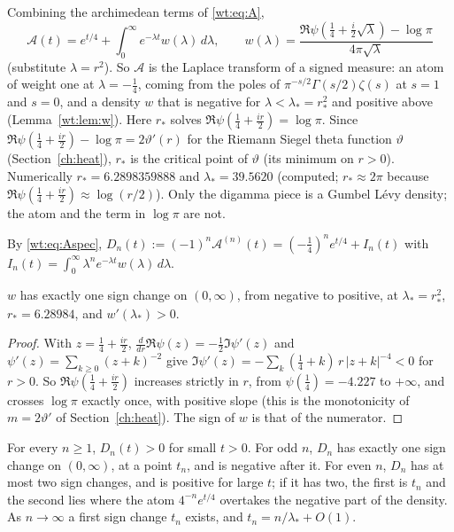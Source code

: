 Combining the archimedean terms of \eqref{wt:eq:A},
\begin{equation}\label{wt:eq:Aspec}
\mathcal A(t)=e^{t/4}+\int_0^\infty e^{-\lambda t}w(\lambda)\,d\lambda,\qquad w(\lambda)=\frac{\Re\psi(\frac14+\frac i2\sqrt\lambda)-\log\pi}{4\pi\sqrt\lambda}
\end{equation}
(substitute $\lambda=r^2$). So $\mathcal A$ is the Laplace transform of a signed measure: an atom of weight one at $\lambda=-\frac14$, coming from the poles of $\pi^{-s/2}\Gamma(s/2)\zeta(s)$ at $s=1$ and $s=0$, and a density $w$ that is negative for $\lambda<\lambda_*=r_*^2$ and positive above (Lemma~\ref{wt:lem:w}). Here $r_*$ solves $\Re\psi(\frac14+\frac{ir}2)=\log\pi$. Since $\Re\psi(\frac14+\frac{ir}2)-\log\pi=2\vartheta'(r)$ for the Riemann Siegel theta function $\vartheta$ (Section~\ref{ch:heat}), $r_*$ is the critical point of $\vartheta$ (its minimum on $r>0$). Numerically $r_*=6.2898359888$ and $\lambda_*=39.5620$ (computed; $r_*\approx2\pi$ because $\Re\psi(\frac14+\frac{ir}2)\approx\log(r/2)$). Only the digamma piece is a Gumbel L\'evy density; the atom and the term in $\log\pi$ are not.

By \eqref{wt:eq:Aspec}, $D_n(t):=(-1)^n\mathcal A^{(n)}(t)=(-\tfrac14)^ne^{t/4}+I_n(t)$ with $I_n(t)=\int_0^\infty\lambda^ne^{-\lambda t}w(\lambda)\,d\lambda$.

\begin{lemma}\label{wt:lem:w}
$w$ has exactly one sign change on $(0,\infty)$, from negative to positive, at $\lambda_*=r_*^2$, $r_*=6.28984$, and $w'(\lambda_*)>0$.
\end{lemma}

\begin{proof}
With $z=\frac14+\frac{ir}2$, $\frac d{dr}\Re\psi(z)=-\frac12\Im\psi'(z)$ and $\psi'(z)=\sum_{k\ge0}(z+k)^{-2}$ give $\Im\psi'(z)=-\sum_k(\frac14+k)\,r\,|z+k|^{-4}<0$ for $r>0$. So $\Re\psi(\frac14+\frac{ir}2)$ increases strictly in $r$, from $\psi(\frac14)=-4.227$ to $+\infty$, and crosses $\log\pi$ exactly once, with positive slope (this is the monotonicity of $m=2\vartheta'$ of Section~\ref{ch:heat}). The sign of $w$ is that of the numerator.
\end{proof}

\begin{proposition}\label{wt:prop:window}
For every $n\ge1$, $D_n(t)>0$ for small $t>0$. For odd $n$, $D_n$ has exactly one sign change on $(0,\infty)$, at a point $t_n$, and is negative after it. For even $n$, $D_n$ has at most two sign changes, and is positive for large $t$; if it has two, the first is $t_n$ and the second lies where the atom $4^{-n}e^{t/4}$ overtakes the negative part of the density. As $n\to\infty$ a first sign change $t_n$ exists, and $t_n=n/\lambda_*+O(1)$.
\end{proposition}

